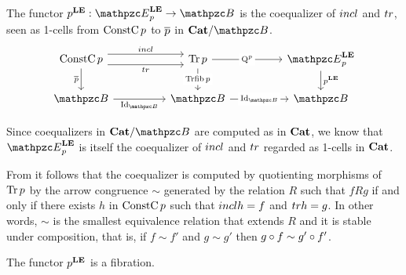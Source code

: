 \documentclass{lmcs} %
\theoremstyle{plain}\newtheorem{satz}[thm]{Satz} %
\begin{document}
			\begin{defi}
				The functor $\LEFib{p}:\LEDomE{p}\to\ct{B}$ is the coequalizer of $incl$ and $tr$, seen as 1-cells from $\mathop{\mathrm{ConstC}}\nolimits{p}$ to $\overline{p}$ in $\Cattwo/\ct{B}$.
				\[\begin{tikzcd}
					{\ConstCat{p}} && {\Tr{p}} && {\LEDomE{p}} \\
					{\ct{B}} && {\ct{B}} && {\ct{B}}
					\arrow["\triang"', shift right=2, from=1-1, to=1-3]
					\arrow["\incl", shift left=2, from=1-1, to=1-3]
					\arrow["{\ConstFib{p}}"', from=1-1, to=2-1]
					\arrow["{\quot{p}}"{description}, from=1-3, to=1-5]
					\arrow["{\Trfib{p}}"{description}, from=1-3, to=2-3]
					\arrow["{\LEFib{p}}", from=1-5, to=2-5]
					\arrow["{\Id{\ct{B}}}"', from=2-1, to=2-3]
					\arrow["{\Id{\ct{B}}}"{description}, from=2-3, to=2-5]
				\end{tikzcd}\]
			\end{defi}

Since coequalizers in $\Cattwo/\ct{B}$ are computed as in $\mathbf{Cat}$, 
we know that $\LEDomE{p}$ is itself the coequalizer of  $incl$ and $tr$ regarded as 1-cells in $\mathbf{Cat}$.

From \cite[Prop 3.16 and Prop. 4.1]{bednarczyk1999generalized} 
it follows that the coequalizer is computed by quotienting morphisms of $\mathop{\mathrm{Tr}}\nolimits{p}$ 
by the arrow congruence $\sim$ generated by the relation $R$ such that 
 $f R g$ if and only if there exists $h$ in $\mathop{\mathrm{ConstC}}\nolimits{p}$ such that $incl h=f$ and $tr h=g$. 
In other words, $\sim$ is the smallest equivalence relation that extends $R$ and it is stable under composition, that is, 
if $f\sim f'$ and $g\sim g'$ then $g\circ f \sim g' \circ f'$. 



			\begin{prop}
				The functor ${p}^{\mathbf{LE}}$ is a fibration.
			\end{prop}
			
\end{document}
